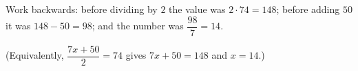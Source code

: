 Work backwards: before dividing by $2$ the value was $2\cdot74=148$; before adding $50$ it was $148-50=98$; and the number was $\dfrac{98}{7}=\boxed{14}$.

(Equivalently, $\dfrac{7x+50}{2}=74$ gives $7x+50=148$ and $x=14$.)

